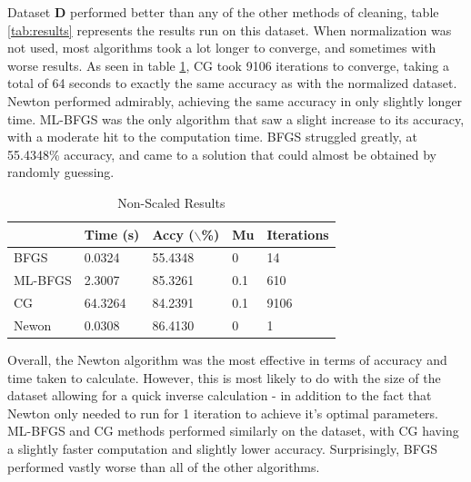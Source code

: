 \documentclass[12pt,conference]{IEEEtran}
\begin{document}
Dataset \textbf{D} performed better than any of the other methods of cleaning, table \ref{tab:results} represents the results run on this dataset. When normalization was not used, most algorithms took a lot longer to converge, and sometimes with worse results. As seen in table \ref{tab:bad-results}, CG took 9106 iterations to converge, taking a total of 64 seconds to exactly the same accuracy as with the normalized dataset. Newton performed admirably, achieving the same accuracy in only slightly longer time. ML-BFGS was the only algorithm that saw a slight increase to its accuracy, with a moderate hit to the computation time. BFGS struggled greatly, at 55.4348\% accuracy, and came to a solution that could almost be obtained by randomly guessing.

\begin{table}[!ht]
\caption{\label{tab:bad-results}Non-Scaled Results }
    \centering
    \begin{tabular}{|l|l|l|l|l|}
    \hline
        ~ & Time (s) & Accy ($\backslash$\%) & Mu & Iterations \\ \hline
        BFGS & 0.0324 & 55.4348 & 0 & 14 \\ \hline
        ML-BFGS & 2.3007 & 85.3261 & 0.1 & 610 \\ \hline
        CG & 64.3264 & 84.2391 & 0.1 & 9106 \\ \hline
        Newon & 0.0308 & 86.4130 & 0 & 1 \\ \hline
    \end{tabular}
\end{table}

Overall, the Newton algorithm was the most effective in terms of accuracy and time taken to calculate. However, this is most likely to do with the size of the dataset allowing for a quick inverse calculation - in addition to the fact that Newton only needed to run for 1 iteration to achieve it's optimal parameters. ML-BFGS and CG methods performed similarly on the dataset, with CG having a slightly faster computation and slightly lower accuracy. Surprisingly, BFGS performed vastly worse than all of the other algorithms.
\end{document}
